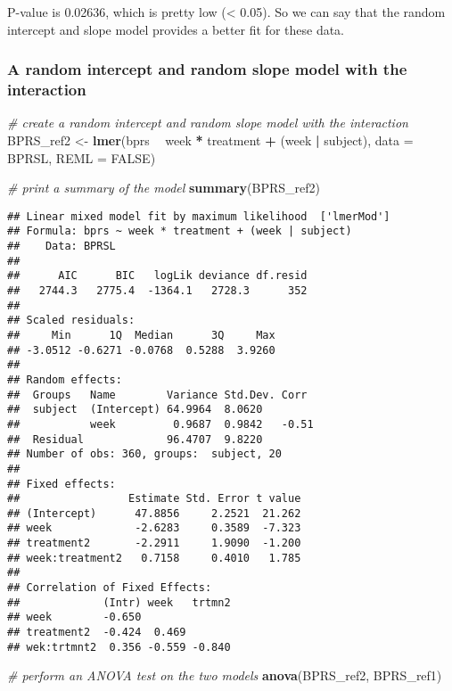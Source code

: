 \documentclass[]{article}
\newenvironment{Shaded}{\begin{snugshade}}{\end{snugshade}}
\newcommand{\KeywordTok}[1]{\textcolor[rgb]{0.13,0.29,0.53}{\textbf{#1}}}
\newcommand{\DataTypeTok}[1]{\textcolor[rgb]{0.13,0.29,0.53}{#1}}
\newcommand{\StringTok}[1]{\textcolor[rgb]{0.31,0.60,0.02}{#1}}
\newcommand{\CommentTok}[1]{\textcolor[rgb]{0.56,0.35,0.01}{\textit{#1}}}
\newcommand{\OtherTok}[1]{\textcolor[rgb]{0.56,0.35,0.01}{#1}}
\newcommand{\OperatorTok}[1]{\textcolor[rgb]{0.81,0.36,0.00}{\textbf{#1}}}
\newcommand{\NormalTok}[1]{#1}
\begin{document}
P-value is 0.02636, which is pretty low (\textless{} 0.05). So we can
say that the random intercept and slope model provides a better fit for
these data.

\subsubsection{A random intercept and random slope model with the
interaction}\label{a-random-intercept-and-random-slope-model-with-the-interaction}

\begin{Shaded}
\begin{Highlighting}[]
\CommentTok{# create a random intercept and random slope model with the interaction}
\NormalTok{BPRS_ref2 <-}\StringTok{ }\KeywordTok{lmer}\NormalTok{(bprs }\OperatorTok{~}\StringTok{ }\NormalTok{week }\OperatorTok{*}\StringTok{ }\NormalTok{treatment }\OperatorTok{+}\StringTok{ }\NormalTok{(week }\OperatorTok{|}\StringTok{ }\NormalTok{subject), }\DataTypeTok{data =}\NormalTok{ BPRSL, }\DataTypeTok{REML =} \OtherTok{FALSE}\NormalTok{)}

\CommentTok{# print a summary of the model}
\KeywordTok{summary}\NormalTok{(BPRS_ref2)}
\end{Highlighting}
\end{Shaded}

\begin{verbatim}
## Linear mixed model fit by maximum likelihood  ['lmerMod']
## Formula: bprs ~ week * treatment + (week | subject)
##    Data: BPRSL
## 
##      AIC      BIC   logLik deviance df.resid 
##   2744.3   2775.4  -1364.1   2728.3      352 
## 
## Scaled residuals: 
##     Min      1Q  Median      3Q     Max 
## -3.0512 -0.6271 -0.0768  0.5288  3.9260 
## 
## Random effects:
##  Groups   Name        Variance Std.Dev. Corr 
##  subject  (Intercept) 64.9964  8.0620        
##           week         0.9687  0.9842   -0.51
##  Residual             96.4707  9.8220        
## Number of obs: 360, groups:  subject, 20
## 
## Fixed effects:
##                 Estimate Std. Error t value
## (Intercept)      47.8856     2.2521  21.262
## week             -2.6283     0.3589  -7.323
## treatment2       -2.2911     1.9090  -1.200
## week:treatment2   0.7158     0.4010   1.785
## 
## Correlation of Fixed Effects:
##             (Intr) week   trtmn2
## week        -0.650              
## treatment2  -0.424  0.469       
## wek:trtmnt2  0.356 -0.559 -0.840
\end{verbatim}

\begin{Shaded}
\begin{Highlighting}[]
\CommentTok{# perform an ANOVA test on the two models}
\KeywordTok{anova}\NormalTok{(BPRS_ref2, BPRS_ref1)}
\end{Highlighting}
\end{Shaded}
\end{document}
